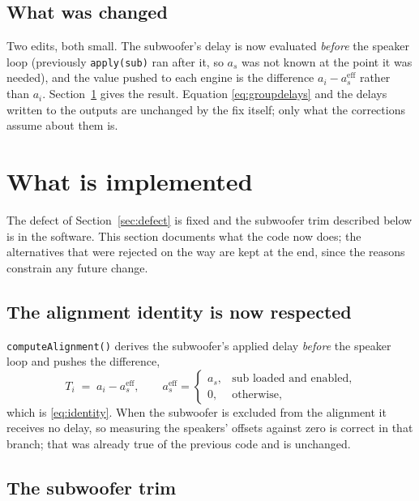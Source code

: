 \documentclass[11pt,a4paper]{article}
\newcommand{\code}[1]{\texttt{\small #1}}
\begin{document}
\subsection{What was changed}

Two edits, both small. The subwoofer's delay is now evaluated \emph{before} the
speaker loop (previously \code{apply(sub)} ran after it, so $a_s$ was not
known at the point it was needed), and the value pushed to each engine is the
difference $a_i - a_s^{\mathrm{eff}}$ rather than $a_i$.
Section~\ref{sec:proposal} gives the result. Equation \eqref{eq:groupdelays} and
the delays written to the outputs are unchanged by the fix itself; only what the
corrections assume about them is.

\section{What is implemented}
\label{sec:proposal}

The defect of Section~\ref{sec:defect} is fixed and the subwoofer trim described
below is in the software. This section documents what the code now does; the
alternatives that were rejected on the way are kept at the end, since the reasons
constrain any future change.

\subsection{The alignment identity is now respected}

\code{computeAlignment()} derives the subwoofer's applied delay \emph{before}
the speaker loop and pushes the difference,
%
\begin{equation}
  T_i \;=\; a_i - a_s^{\mathrm{eff}},
  \qquad
  a_s^{\mathrm{eff}} = \begin{cases}
    a_s, & \text{sub loaded and enabled},\\
    0,   & \text{otherwise,}
  \end{cases}
\end{equation}
%
which is \eqref{eq:identity}. When the subwoofer is excluded from the alignment
it receives no delay, so measuring the speakers' offsets against zero is correct
in that branch; that was already true of the previous code and is unchanged.

\subsection{The subwoofer trim}
\end{document}
